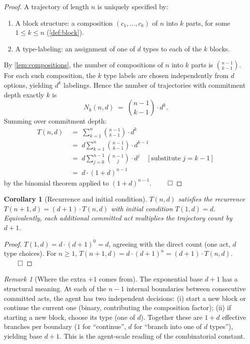 \documentclass[11pt,twocolumn,a4paper]{article}
\theoremstyle{thmstyle}
\newtheorem{corollary}[theorem]{Corollary}
\theoremstyle{definition}
\theoremstyle{remark}
\newtheorem{remark}[theorem]{Remark}
\begin{document}
\begin{proof}
A trajectory of length $n$ is uniquely specified by:
\begin{enumerate}[nosep,leftmargin=*]
\item A block structure: a composition $(c_1, \ldots, c_k)$ of $n$
into $k$ parts, for some $1 \leq k \leq n$
(\cref{def:block}).
\item A type-labeling: an assignment of one of $d$ types to each
of the $k$ blocks.
\end{enumerate}
By \cref{lem:compositions}, the number of compositions of $n$ into
$k$ parts is $\binom{n-1}{k-1}$. For each such composition, the
$k$ type labels are chosen independently from $d$ options, yielding
$d^k$ labelings. Hence the number of trajectories with commitment
depth exactly $k$ is
\[
  N_k(n, d) \;=\; \binom{n-1}{k-1} \cdot d^k.
\]
Summing over commitment depth:
\begin{align*}
  T(n, d) &\;=\; \sum_{k=1}^{n} \binom{n-1}{k-1} \cdot d^k \\
  &\;=\; d \sum_{k=1}^{n} \binom{n-1}{k-1} \cdot d^{k-1} \\
  &\;=\; d \sum_{j=0}^{n-1} \binom{n-1}{j} \cdot d^{j}
  \quad [\text{substitute } j = k - 1] \\
  &\;=\; d \cdot (1 + d)^{n-1}
\end{align*}
by the binomial theorem applied to $(1 + d)^{n-1}$. $\qed$
\end{proof}

\begin{corollary}[Recurrence and initial condition]
\label{cor:inflation_recurrence}
$T(n, d)$ satisfies the recurrence
$T(n+1, d) = (d + 1) \cdot T(n, d)$ with initial condition
$T(1, d) = d$. Equivalently, each additional committed act
multiplies the trajectory count by $d + 1$.
\end{corollary}

\begin{proof}
$T(1, d) = d \cdot (d+1)^0 = d$, agreeing with the direct count
(one act, $d$ type choices). For $n \geq 1$,
$T(n + 1, d) = d \cdot (d+1)^{n} = (d+1) \cdot T(n, d)$. $\qed$
\end{proof}

\begin{remark}[Where the extra $+1$ comes from]
\label{rem:plus_one}
The exponential base $d + 1$ has a structural meaning. At each of
the $n - 1$ internal boundaries between consecutive committed acts,
the agent has two independent decisions: (i) start a new block or
continue the current one (binary, contributing the composition
factor); (ii) if starting a new block, choose its type (one of $d$).
Together these are $1 + d$ effective branches per boundary
($1$ for ``continue'', $d$ for ``branch into one of $d$ types''),
yielding base $d + 1$. This is the agent-scale reading of the
combinatorial constant.
\end{remark}
\end{document}
